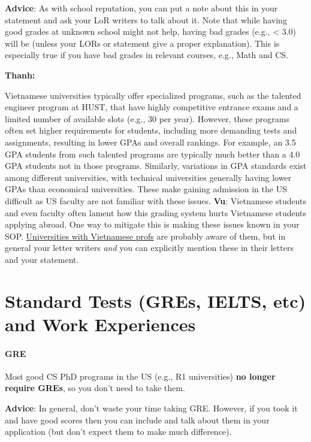 \documentclass[oneside,11pt,dvipsnames]{book}
\newenvironment{commentbox}[1][]{
  \small
  \begin{mybox}
    {\small \textbf{#1}}
  }{
  \end{mybox}
}
\newcommand{\red}[1]{{\color{red}{#1}}}
\begin{document}
\textbf{Advice}: As with school reputation, you can put a note about this in your statement and ask your LoR writers to talk about it.
Note that while having good grades at unknown school might not help,
having bad grades (e.g., < 3.0) will be \red{red flag} (unless your LORs or
statement give a proper explanation). This is especially true if you
have bad grades in relevant courses, e.g., Math and CS.

\begin{commentbox}[Thanh:]
  Vietnamese universities typically offer specialized programs, such as the talented engineer program at HUST, that have highly competitive entrance exams and a limited number of available slots (e.g., 30 per year). However, these programs often set higher requirements for students, including more demanding tests and assignments, resulting in lower GPAs and overall rankings. For example, an 3.5 GPA students from such talented programs are typically much better than a 4.0 GPA students not in those programs.  Similarly, variations in GPA standards exist among different universities, with technical universities generally having lower GPAs than economical universities. These make gaining admission in the US difficult as US faculty are not familiar with these issues.
  \tcblower
  \textbf{Vu}: Vietnamese students and even faculty often lament how this grading system hurts Vietnamese students applying abroad. One way to mitigate this is making these issues known in your SOP.  \href{https://github.com/dynaroars/dynaroars.github.io/wiki/Viet-CS-Profs-US}{Universities with Vietnamese profs} are probably aware of them, but in general your letter writers \emph{and} you can explicitly mention these in their letters and your statement.
\end{commentbox}

\section{Standard Tests (GREs, IELTS, etc) and Work Experiences}\label{sec:standard-tests}


\paragraph{GRE} Most good CS PhD programs in the US (e.g., R1 universities) \textbf{no longer require GREs}, so you don't need to take them.

\textbf{Advice}: In general, don't waste your time taking GRE.  However, if you took it and have good scores then you can include and talk about them in your application (but don't expect them to make much difference).
\end{document}
